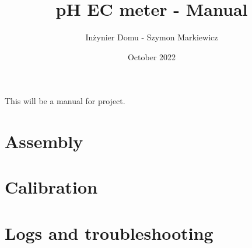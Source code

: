 \documentclass{article}
\title{pH EC meter - Manual}
\author{Inżynier Domu - Szymon Markiewicz}
\date{October 2022}
\begin{document}
\maketitle
\tableofcontents


This will be a manual for project.
\section{Assembly}
\section{Calibration}
\section{Logs and troubleshooting}
\end{document}
